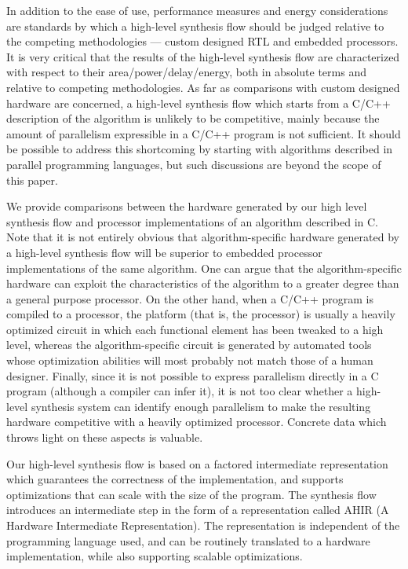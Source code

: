 \documentclass[conference]{IEEEtran}
\begin{document}
In addition to the ease of use, performance measures and energy
considerations are standards by which a high-level synthesis flow
should be judged relative to the competing methodologies --- custom
designed RTL and embedded processors.  It is very critical
that the results of the high-level synthesis flow are characterized
with respect to their area/power/delay/energy, both in absolute terms
and relative to competing methodologies.  As far as comparisons
with  custom designed hardware are concerned, a high-level synthesis flow
which starts from a C/C++ description of the algorithm is unlikely to
be competitive, mainly because the amount of parallelism expressible in 
a C/C++ program is not sufficient.   It should be possible to address
this shortcoming by starting with algorithms described in parallel
programming languages, but such discussions are beyond the scope of
this paper.   

We provide comparisons between
the hardware generated by our high level synthesis flow and  
processor implementations of an algorithm described in C.  
Note that it is not entirely obvious that algorithm-specific hardware 
generated by a high-level synthesis flow will be superior
to embedded processor implementations of the same algorithm.  
One can argue that the algorithm-specific hardware
can exploit the characteristics of the algorithm to a greater
degree than a general purpose processor.  
On the other hand, when a C/C++ program is compiled to
a processor, the platform (that is, the processor) is usually a
heavily optimized circuit in which each functional
element has been tweaked to a
high level, whereas the algorithm-specific
circuit is generated by automated tools whose optimization abilities
will most probably not match those of a human designer.   
Finally, since it is not possible to express parallelism
directly in a C program (although a compiler can infer it),
it is not too clear whether a high-level synthesis system can
identify enough parallelism to make the resulting hardware competitive
with a heavily optimized processor.  Concrete data which throws light on these aspects is valuable.

Our high-level synthesis flow is based on a factored intermediate
representation which guarantees the correctness of the implementation,
and supports optimizations that can scale with the size of the
program. The synthesis flow introduces an intermediate step in the
form of a representation called AHIR (A Hardware Intermediate
Representation). The representation is independent of the programming
language used, and can be routinely translated to a hardware
implementation, while also supporting scalable
optimizations\cite{AHIR_sameerds_hakim_2007}\cite{ahir_thesis}.
\end{document}
